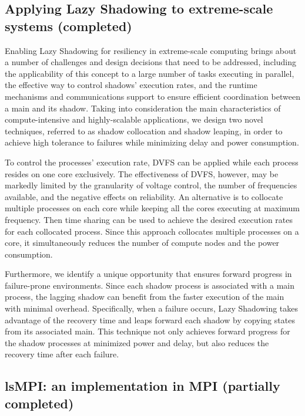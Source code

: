 \subsection{Applying Lazy Shadowing to extreme-scale systems (completed)}

Enabling Lazy Shadowing for resiliency in extreme-scale computing brings about a number of challenges and design decisions 
that need to be addressed, including the applicability of this concept to a large number of tasks executing in parallel, 
the effective way to control shadows’ execution rates, and the runtime mechanisms and communications support to ensure efficient 
coordination between a main and its shadow. Taking into consideration the main characteristics of compute-intensive and 
highly-scalable applications, we design two novel techniques, referred to as shadow collocation and shadow leaping, 
in order to achieve high tolerance to failures while minimizing delay and power consumption.

To control the processes' execution rate, DVFS can be applied while each process resides on one core exclusively. 
The effectiveness of DVFS, however, may be markedly 
limited by the granularity of voltage control, the number of frequencies available, and the negative effects on 
reliability. 
An alternative is to collocate multiple processes on each core while keeping all the cores executing at maximum frequency. 
Then time sharing can be used to achieve the desired execution rates for each collocated process. 
Since this approach collocates multiple processes on a core, it simultaneously reduces the number of compute nodes and 
the power consumption. 

Furthermore, we identify a unique opportunity that ensures forward progress in failure-prone environments. Since each shadow process is associated with a main process, the lagging shadow can benefit from the faster execution 
of the main with minimal overhead. Specifically, when a failure occurs, Lazy Shadowing takes advantage of 
the recovery time and leaps forward each shadow by copying states from its associated main. This technique not only achieves forward 
progress for the shadow processes at minimized power and delay, but also reduces the recovery time after each failure.

\subsection{lsMPI: an implementation in MPI (partially completed)}

